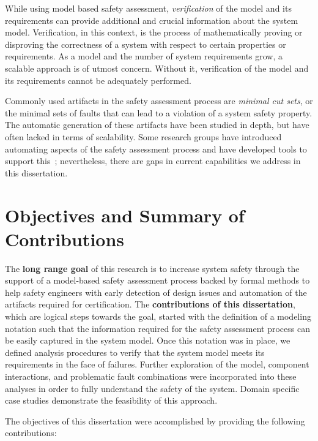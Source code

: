 While using model based safety assessment, \emph{verification} of the model and its requirements can provide additional and crucial information about the system model. Verification, in this context, is the process of mathematically proving or disproving the correctness of a system with respect to certain properties or requirements. As a model and the number of system requirements grow, a scalable approach is of utmost concern. Without it, verification of the model and its requirements cannot be adequately performed. 

Commonly used artifacts in the safety assessment process are \emph{minimal cut sets}, or the minimal sets of faults that can lead to a violation of a system safety property. The automatic generation of these artifacts have been studied in depth, but have often lacked in terms of scalability\cite{minato2001zero,vesely1981fault,jung2008fast,matuzas2015dynamic,Bieber04safetyassessment}. Some research groups have introduced automating aspects of the safety assessment process and have developed tools to support this~\cite{Joshi05:SafeComp,CAV2015:BoCiGrMa,10.1007/978-3-319-11936-6-7}; nevertheless, there are gaps in current capabilities we address in this dissertation. 

\section{Objectives and Summary of Contributions}
The \textbf{long range goal} of this research is to increase system safety through the support of a model-based safety assessment process backed by formal methods to help safety engineers with early detection of design issues and automation of the artifacts required for certification. The \textbf{contributions of this dissertation}, which are logical steps towards the goal, started with the definition of a modeling notation such that the information required for the safety assessment process can be easily captured in the system model. Once this notation was in place, we defined analysis procedures to verify that the system model meets its requirements in the face of failures. Further exploration of the model, component interactions, and problematic fault combinations were incorporated into these analyses in order to fully understand the safety of the system. Domain specific case studies demonstrate the feasibility of this approach.

The objectives of this dissertation were accomplished by providing the following contributions: 

